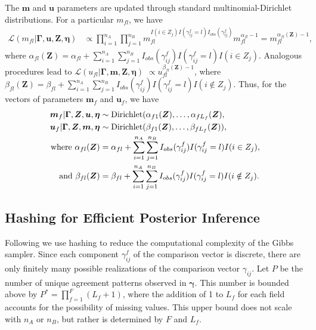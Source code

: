 \documentclass[12pt,letterpaper]{article}
\newcommand{\1}[1]{\mathbb{I}\!\left[#1\right]} %
\begin{document}
The $\bm{m}$ and $\bm{u}$ parameters are updated through standard multinomial-Dirichlet distributions. For a particular $m_{fl}$, we have
\begin{align*}
	\mathcal{L}(m_{fl}|\bm{\Gamma}, \bm{u}, \bm{Z}, \bm{\eta}) &\propto \prod_{i=1}^{n_A} \prod_{j=1}^{n_B} m_{fl}^{I(i \in Z_j) I(\gamma_{ij}^f = l) I_{obs}(\gamma_{ij}^f)}  m_{fl}^{\alpha_{fl} - 1} = m_{fl}^{\alpha_{fl}(\bm{Z}) - 1},
\end{align*}
where $\alpha_{fl}(\bm{Z})= \alpha_{fl} + \sum_{i=1}^{n_A}  \sum_{j=1}^{n_B} I_{obs}(\gamma_{ij}^f)I(\gamma_{ij}^f = l) I(i \in Z_j)$. Analogous procedures lead to $\mathcal{L}(u_{fl}| \bm{\Gamma}, \bm{m}, \bm{Z}, \bm{\eta})$  $\propto u_{fl}^{\beta_{fl}(\bm{Z}) - 1}$, where $\beta_{fl}(\bm{Z})= \beta_{fl} + \sum_{i=1}^{n_A}  \sum_{j=1}^{n_B} I_{obs}(\gamma_{ij}^f)I(\gamma_{ij}^f = l) I(i \notin Z_j)$. Thus, for the vectors of parameters $\bm{m}_f$ and $\bm{u}_f$, we have
\begin{align}
	\bm{m}_f|\bm{\Gamma}, \bm{Z}, \bm{u}, \bm{\eta} &\sim \text{Dirichlet}(\alpha_{f1}(\bm{Z}), \ldots, \alpha_{fL_f}(\bm{Z}), \notag \\
	\bm{u}_f|\bm{\Gamma}, \bm{Z}, \bm{m}, \bm{\eta} &\sim \text{Dirichlet}(\beta_{f1}(\bm{Z}), \ldots, \beta_{fL_f}(\bm{Z})), \notag \\
	\text{where }\alpha_{fl}(\bm{Z})&= \alpha_{fl} + \sum_{i=1}^{n_A}\sum_{j=1}^{n_B} I_{obs}(\gamma_{ij}^f) I(\gamma_{ij}^f = l) I(i \in Z_j), \label{eqn:alpha_update} \\
	\text{and } \beta_{fl}(\bm{Z})&=  \beta_{fl} + \sum_{i=1}^{n_A}\sum_{j=1}^{n_B}  I_{obs}(\gamma_{ij}^f) I(\gamma_{ij}^f = l) I(i \notin Z_j) \label{eqn:beta_update}.
\end{align}

\subsection{Hashing for Efficient Posterior Inference}\label{app:hashing}
Following \cite{kundinger_2023} we use hashing to reduce the computational complexity of the Gibbs sampler. Since each component $\gamma_{ij}^f$ of the comparison vector is discrete, there are only finitely many possible realizations of the comparison vector $\gamma_{ij}$. Let $P$ be the number of unique agreement patterns observed in $\bm{\gamma}$. This number is bounded above by $P^{*} =  \prod_{f=1}^F (L_f + 1)$, where the addition of 1 to $L_f$ for each field accounts for the possibility of missing values. This upper bound does not scale with $n_A$ or $n_B$, but rather is determined by $F$ and $L_f$.  
\end{document}

